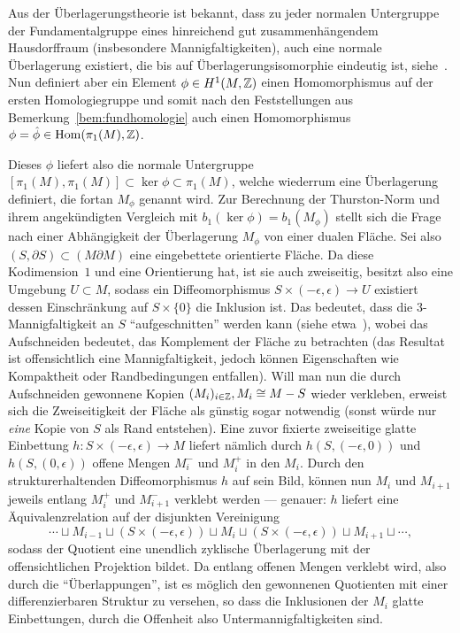 \begin{constr}
	\label{constr:cut}
	Aus der Überlagerungstheorie ist bekannt, dass zu jeder normalen Untergruppe der Fundamentalgruppe eines hinreichend gut zusammenhängendem Hausdorffraum (insbesondere Mannigfaltigkeiten), auch eine normale Überlagerung existiert, die bis auf Überlagerungsisomorphie eindeutig ist, siehe~\cite[Chapter~1.3]{Hatcher.2002}. Nun definiert aber ein Element $\phi\in H^1(M,\mathbb{Z})$ einen Homomorphismus auf der ersten Homologiegruppe und somit nach den Feststellungen aus Bemerkung~\ref{bem:fundhomologie} auch einen Homomorphismus $\phi = \hat \phi \in \operatorname{Hom}(\pi_1(M),\mathbb{Z})$. 

	Dieses $\phi$ liefert also die normale Untergruppe $[\pi_1(M),\pi_1(M)]\subset \ker \phi \subset \pi_1(M)$, welche wiederrum eine Überlagerung definiert, die fortan $M_\phi$ genannt wird. Zur Berechnung der Thurston-Norm und ihrem angekündigten Vergleich mit $b_1(\ker\phi)=b_1(M_\phi)$ stellt sich die Frage nach einer Abhängigkeit der Überlagerung $M_\phi$ von einer dualen Fläche. Sei also $(S,\partial S) \subset (M\partial M)$ eine eingebettete orientierte Fläche. Da diese Kodimension~$1$ und eine Orientierung hat, ist sie auch zweiseitig, besitzt also eine Umgebung $U \subset M$, sodass ein Diffeomorphismus $S\times (-\epsilon,\epsilon) \to U$ existiert dessen Einschränkung auf $S\times \{0\}$ die Inklusion ist. Das bedeutet, dass die 3-Mannigfaltigkeit an $S$ "`aufgeschnitten"' werden kann (siehe etwa~\cite[Kapitel~4.2]{Burde.2003}), wobei das Aufschneiden bedeutet, das Komplement der Fläche zu betrachten (das Resultat ist offensichtlich eine Mannigfaltigkeit, jedoch können Eigenschaften wie Kompaktheit oder Randbedingungen entfallen). Will man nun die durch Aufschneiden gewonnene Kopien $(M_i)_{i\in \mathbb{Z}}, M_i \cong M-S$ wieder verkleben, erweist sich die Zweiseitigkeit der Fläche als günstig sogar notwendig (sonst würde nur \emph{eine} Kopie von $S$ als Rand entstehen). Eine zuvor fixierte zweiseitige glatte Einbettung $h: S\times (-\epsilon,\epsilon) \to M$ liefert nämlich durch $h(S,(-\epsilon,0))$ und $h(S,(0,\epsilon))$ offene Mengen $M_i^-$ und $M_i^+$ in den $M_i$. Durch den strukturerhaltenden Diffeomorphismus $h$ auf sein Bild, können nun $M_i$ und $M_{i+1}$ jeweils entlang $M_i^+$ und $M_{i+1}^-$ verklebt werden --- genauer: $h$ liefert eine Äquivalenzrelation auf der disjunkten Vereinigung 
	\[
		\cdots \sqcup M_{i-1} \sqcup (S \times (-\epsilon,\epsilon)) \sqcup M_i \sqcup  (S \times (-\epsilon,\epsilon)) \sqcup M_{i+1} \sqcup \cdots,
	\]
	sodass der Quotient eine unendlich zyklische Überlagerung mit der offensichtlichen Projektion bildet. Da entlang offenen Mengen verklebt wird, also durch die "`Überlappungen"', ist es möglich den gewonnenen Quotienten mit einer differenzierbaren Struktur zu versehen, so dass die Inklusionen der $M_i$ glatte Einbettungen, durch die Offenheit also Untermannigfaltigkeiten sind.


\end{constr}

